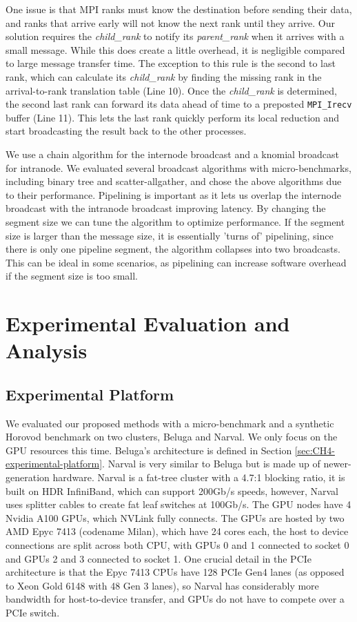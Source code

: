 One issue is that \gls{MPI} ranks must know the destination before sending their data, and ranks that arrive early will not know the next rank until they arrive.
Our solution requires the \textit{child\_rank} to notify its \textit{parent\_rank} when it arrives with a small message.
While this does create a little overhead, it is negligible compared to large message transfer time.
The exception to this rule is the second to last rank, which can calculate its \textit{child\_rank} by finding the missing rank in the arrival-to-rank translation table (Line 10).
Once the \textit{child\_rank} is determined, the second last rank can forward its data ahead of time to a preposted \texttt{MPI\_Irecv} buffer (Line 11).
This lets the last rank quickly perform its local reduction and start broadcasting the result back to the other processes.

We use a chain algorithm for the internode broadcast and a knomial broadcast for intranode. 
We evaluated several broadcast algorithms with micro-benchmarks, including binary tree and scatter-allgather, and chose the above algorithms due to their performance.  
Pipelining is important as it lets us overlap the internode broadcast with the intranode broadcast improving latency.
By changing the segment size we can tune the algorithm to optimize performance.
If the segment size is larger than the message size, it is essentially 'turns of' pipelining, since there is only one pipeline segment, the algorithm collapses into two broadcasts.
This can be ideal in some scenarios, as pipelining can increase software overhead if the segment size is too small.

\section{Experimental Evaluation and Analysis}
\subsection{Experimental Platform}
We evaluated our proposed methods with a micro-benchmark and a synthetic Horovod benchmark on two clusters, Beluga and Narval.
We only focus on the \gls{GPU} resources this time.
Beluga's architecture is defined in Section \ref{sec:CH4-experimental-platform}.
Narval is very similar to Beluga but is made up of newer-generation hardware.
Narval is a fat-tree cluster with a 4.7:1 blocking ratio, it is built on HDR InfiniBand, which can support 200Gb/s speeds, however, Narval uses splitter cables to create fat leaf switches at 100Gb/s.
The \gls{GPU} nodes have 4 Nvidia A100 GPUs, which NVLink fully connects.
The \gls{GPU}s are hosted by two AMD Epyc 7413 (codename Milan), which have 24 cores each, the host to device connections are split across both \gls{CPU}, with \gls{GPU}s 0 and 1 connected to socket 0 and \gls{GPU}s 2 and 3 connected to socket 1. 
One crucial detail in the \gls{PCIe} architecture is that the Epyc 7413 \gls{CPU}s have 128 \gls{PCIe} Gen4 lanes (as opposed to Xeon Gold 6148 with 48 Gen 3 lanes), so Narval has considerably more bandwidth for host-to-device transfer, and \gls{GPU}s do not have to compete over a \gls{PCIe} switch.

